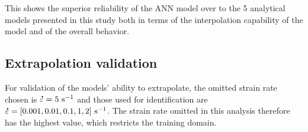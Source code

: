\documentclass[metals,article,submit,pdftex,moreauthors]{Definitions/mdpi}
\DeclareRobustCommand{\mdot}[1]{\accentset{\mbox{\bfseries .}}{#1}}
\DeclareRobustCommand{\ps}{\text{s}^{-1}}
\begin{document}
This shows the superior reliability of the ANN model over to the 5 analytical models presented in this study both in terms of the interpolation capability of the model and of the overall behavior.

\subsection{Extrapolation validation}

For validation of the models' ability to extrapolate, the omitted strain rate chosen is $\mdot\varepsilon=5~\ps$ and those used for identification are $\mdot\varepsilon=[0.001, 0.01, 0.1, 1, 2]~\ps$.
The strain rate omitted in this analysis therefore has the highest value, which restricts the training domain.
\end{document}
